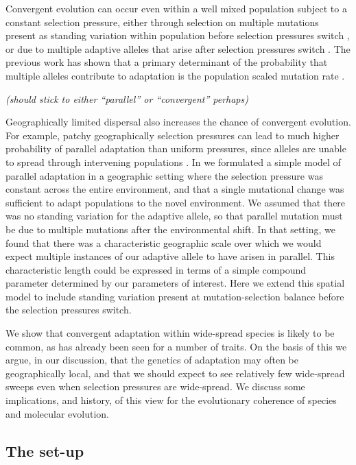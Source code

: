 \documentclass{article}
\newcommand{\plr}[1]{{\it\color{blue}(#1)}}
\begin{document}
Convergent evolution can occur even within a well mixed population
subject to a constant selection pressure, 
either through selection on multiple mutations present as standing variation within population
before selection pressures switch \citep{Orr:01,softsweepsI},
or due to multiple adaptive alleles that arise after selection pressures switch \citet{softsweepsII}. 
The previous work has shown that 
a primary determinant of the probability that multiple alleles contribute to adaptation
is the population scaled mutation rate \citep[see ][ for a review]{MesserPetrov}. 

\plr{should stick to either ``parallel'' or ``convergent'' perhaps}

Geographically limited dispersal also increases the chance of convergent evolution. 
For example, 
patchy geographically selection pressures can lead to much higher probability of parallel adaptation than uniform pressures,
since alleles are unable to spread through intervening populations \citep{RalphCoop:14}. 
In \citep{RalphCoop} we formulated a simple model of parallel adaptation in a geographic setting
where the selection pressure was constant across the entire environment, 
and that a single mutational change was sufficient to adapt populations to the novel environment. 
We assumed that there was no standing variation for the adaptive allele, 
so that parallel mutation must be due to multiple mutations after the environmental shift. 
In that setting, 
we found that there was a characteristic geographic scale over which we would expect 
multiple instances of our adaptive allele to have arisen in parallel. 
This characteristic length could be expressed in terms of a simple compound
parameter determined by our parameters of interest. 
Here we extend this spatial model to include standing variation 
present at mutation-selection balance before the selection pressures switch.

We show that convergent adaptation within wide-spread species is likely to be
common, as has already been seen for a number of traits. 
On the basis of this we argue, in our discussion, that the genetics of
adaptation may often be
geographically local, and that we should expect to see relatively few
wide-spread sweeps even when selection pressures are wide-spread. 
We discuss some implications, and history, of this view for the evolutionary
coherence of species and molecular evolution.

\subsection{The set-up}
\end{document}
